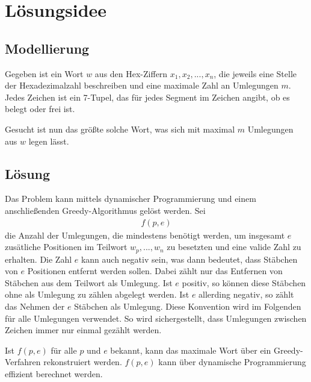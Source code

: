 \documentclass[a4paper,10pt,ngerman]{scrartcl}
\begin{document}
\maketitle
\tableofcontents

\section{Lösungsidee}
\subsection{Modellierung}
Gegeben ist ein Wort $w$ aus den Hex-Ziffern $x_1, x_2, ..., x_n$, die jeweils eine Stelle der Hexadezimalzahl beschreiben und eine maximale Zahl an Umlegungen $m$. 
Jedes Zeichen ist ein 7-Tupel, das für jedes Segment im Zeichen angibt, ob es belegt oder frei ist.

Gesucht ist nun das größte solche Wort, was sich mit maximal $m$ Umlegungen aus $w$ legen lässt.

\subsection{Lösung}
Das Problem kann mittels dynamischer Programmierung und einem anschließenden Greedy-Algorithmus gelöst werden. 
Sei
\begin{align}
    f(p, e)
\end{align}
die Anzahl der Umlegungen, die mindestens benötigt werden, um insgesamt $e$ zusätliche Positionen im Teilwort $w_p, ..., w_n$ zu besetzten und eine valide Zahl zu erhalten. Die Zahl $e$ kann auch negativ sein, was dann bedeutet, dass Stäbchen von $e$ Positionen entfernt werden sollen. Dabei zählt nur das Entfernen von Stäbchen aus dem Teilwort als Umlegung. Ist $e$ positiv, so können diese Stäbchen ohne als Umlegung zu zählen abgelegt werden. Ist $e$ allerding negativ, so zählt das Nehmen der $e$ Stäbchen als Umlegung. Diese Konvention wird im Folgenden für alle Umlegungen verwendet. So wird sichergestellt, dass Umlegungen zwischen Zeichen immer nur einmal gezählt werden.

Ist $f(p, e)$ für alle $p$ und $e$ bekannt, kann das maximale Wort über ein Greedy-Verfahren rekonstruiert werden. 
$f(p, e)$ kann über dynamische Programmierung effizient berechnet werden. 
\end{document}

